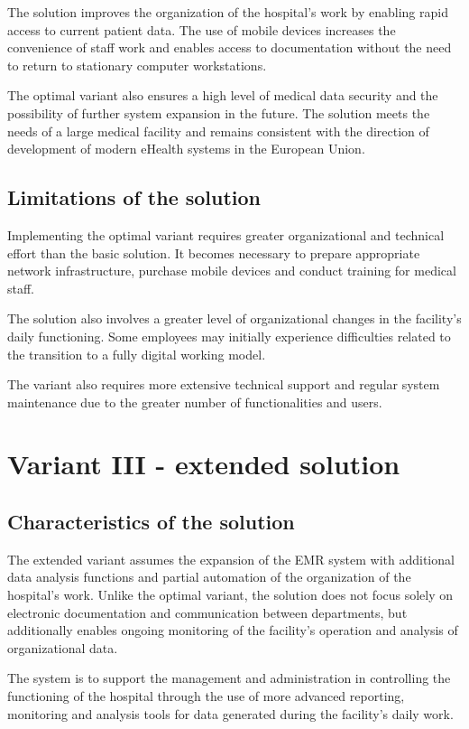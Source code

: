 The solution improves the organization of the hospital's work by enabling rapid access to current patient data. The use of mobile devices increases the convenience of staff work and enables access to documentation without the need to return to stationary computer workstations.

The optimal variant also ensures a high level of medical data security and the possibility of further system expansion in the future. The solution meets the needs of a large medical facility and remains consistent with the direction of development of modern eHealth systems in the European Union.

\subsection{Limitations of the solution}
Implementing the optimal variant requires greater organizational and technical effort than the basic solution. It becomes necessary to prepare appropriate network infrastructure, purchase mobile devices and conduct training for medical staff.

The solution also involves a greater level of organizational changes in the facility's daily functioning. Some employees may initially experience difficulties related to the transition to a fully digital working model.

The variant also requires more extensive technical support and regular system maintenance due to the greater number of functionalities and users.

\section{Variant III - extended solution}

\subsection{Characteristics of the solution}
The extended variant assumes the expansion of the EMR system with additional data analysis functions and partial automation of the organization of the hospital's work. Unlike the optimal variant, the solution does not focus solely on electronic documentation and communication between departments, but additionally enables ongoing monitoring of the facility's operation and analysis of organizational data.

The system is to support the management and administration in controlling the functioning of the hospital through the use of more advanced reporting, monitoring and analysis tools for data generated during the facility's daily work.
